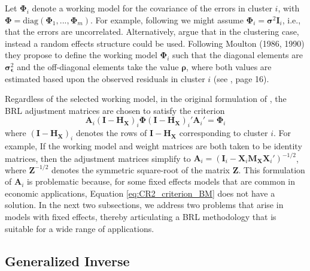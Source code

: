 \documentclass[12pt]{article}
\newcommand{\bm}{\mathbf}
\newcommand{\bs}{\boldsymbol}
\begin{document}

Let $\bs\Phi_i$ denote a working model for the covariance of the errors in cluster $i$, with $\bs\Phi = \text{diag}\left(\bs\Phi_1,...,\bs\Phi_m\right)$. 
For example, following \citet{Bell2002bias} we might assume $\bs\Phi_i = \bs\sigma^2 \bm{I}_i$, i.e., that the errors are uncorrelated. 
Alternatively, \citet{Imbens2015robust} argue that in the clustering case, instead a random effects structure could be used. 
Following Moulton (1986, 1990) they propose to define the working model $\bs\Phi_i$ such that the diagonal elements are $\bs\sigma_{\bs\epsilon}^2$ and the off-diagonal elements take the value $\bs\rho$, where both values are estimated based upon the observed residuals in cluster $i$ (see \citet{Imbens2015robust}, page 16).

Regardless of the selected working model, in the original formulation of \citet{Bell2002bias}, the BRL adjustment matrices are chosen to satisfy the criterion
\begin{equation}
\label{eq:CR2_criterion_BM}
\bm{A}_i \left(\bm{I} - \bm{H_X}\right)_i \bs\Phi \left(\bm{I} - \bm{H_X}\right)_i' \bm{A}_i'  =  \bs\Phi_i 
\end{equation}
where $\left(\bm{I} - \bm{H_X}\right)_i$ denotes the rows of $\bm{I} - \bm{H_X}$ corresponding to cluster $i$.
For example, If the working model and weight matrices are both taken to be identity matrices, then the adjustment matrices simplify to $\bm{A}_i = \left(\bm{I}_i - \bm{X}_i\bm{M_X} \bm{X}_i'\right)^{-1/2}$, where $\bm{Z}^{-1/2}$ denotes the symmetric square-root of the matrix $\bm{Z}$. 
This formulation of $\bm{A}_i$ is problematic because, for some fixed effects models that are common in economic applications, Equation \ref{eq:CR2_criterion_BM} does not have a solution. 
In the next two subsections, we address two problems that arise in models with fixed effects, thereby articulating a BRL methodology that is suitable for a wide range of applications.

\subsection{Generalized Inverse}
\end{document}
